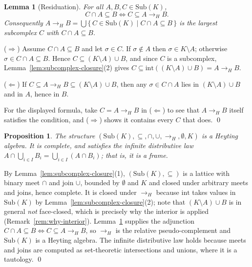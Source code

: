 \documentclass[final,12pt]{elsarticle}
\theoremstyle{plain}
\newtheorem{lem}[thm]{Lemma}
\newtheorem{prop}[thm]{Proposition}
\theoremstyle{definition}
\begin{document}
\begin{lem}[Residuation]
\label{lem:residuation}
For all \(A, B, C \in \mathrm{Sub}(K)\),
\[
C \cap A \subseteq B \iff C \subseteq A \to_H B .
\]
Consequently
\(A \to_H B = \bigcup\{\, C \in \mathrm{Sub}(K) \mid C \cap A \subseteq B \,\}\)
is the largest subcomplex \(C\) with \(C \cap A \subseteq B\).
\end{lem}

\proof
(\(\Rightarrow\)) Assume \(C \cap A \subseteq B\) and let \(\sigma \in C\). If
\(\sigma \notin A\) then \(\sigma \in K \setminus A\); otherwise
\(\sigma \in C \cap A \subseteq B\). Hence
\(C \subseteq (K \setminus A) \cup B\), and since \(C\) is a subcomplex,
Lemma~\ref{lem:subcomplex-closure}(2) gives
\(C \subseteq \mathrm{int}((K \setminus A) \cup B) = A \to_H B\).

(\(\Leftarrow\)) If \(C \subseteq A \to_H B \subseteq (K \setminus A) \cup B\),
then any \(\sigma \in C \cap A\) lies in \((K \setminus A) \cup B\) and in \(A\),
hence in \(B\).

For the displayed formula, take \(C = A \to_H B\) in (\(\Leftarrow\)) to see that
\(A \to_H B\) itself satisfies the condition, and (\(\Rightarrow\)) shows it
contains every \(C\) that does.
\qed

\begin{prop}
\label{prop:heyting-algebra}
The structure
\((\mathrm{Sub}(K), \subseteq, \cap, \cup, \to_H, \emptyset, K)\) is a Heyting
algebra. It is complete, and satisfies the infinite distributive law
\(A \cap \bigcup_{i \in I} B_i = \bigcup_{i \in I}(A \cap B_i)\); that is, it is
a frame.
\end{prop}

\proof
By Lemma~\ref{lem:subcomplex-closure}(1), \((\mathrm{Sub}(K), \subseteq)\) is a
lattice with binary meet \(\cap\) and join \(\cup\), bounded by \(\emptyset\)
and \(K\) and closed under arbitrary meets and joins, hence complete. It is
closed under \(\to_H\) because \(\mathrm{int}\) takes values in
\(\mathrm{Sub}(K)\) by Lemma~\ref{lem:subcomplex-closure}(2); note that
\((K \setminus A) \cup B\) is in general \emph{not} face-closed, which is
precisely why the interior is applied
(Remark~\ref{rem:why-interior}). Lemma~\ref{lem:residuation} supplies the
adjunction \(C \cap A \subseteq B \iff C \subseteq A \to_H B\), so \(\to_H\) is
the relative pseudo-complement and \(\mathrm{Sub}(K)\) is a Heyting algebra. The
infinite distributive law holds because meets and joins are computed as
set-theoretic intersections and unions, where it is a tautology.
\qed
\end{document}
